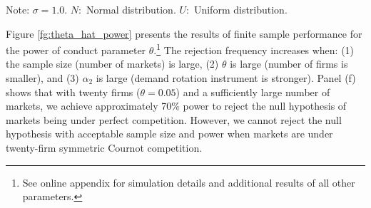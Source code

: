 \documentclass[11pt, a4paper]{article}
\begin{document}
\begin{table}[!htbp]
    \caption{True parameters and distributions}
    \label{tb:parameter_setting}
    \begin{center}
    \end{center}
    \footnotesize
    Note: $\sigma=1.0$. $N:$ Normal distribution. $U:$ Uniform distribution.
\end{table}

Figure \ref{fg:theta_hat_power} presents the results of finite sample performance for the power of conduct parameter $\theta$.\footnote{See online appendix for simulation details and additional results of all other parameters.}
The rejection frequency increases when: (1) the sample size (number of markets) is large, (2) $\theta$ is large (number of firms is smaller), and (3) $\alpha_2$ is large (demand rotation instrument is stronger).
Panel (f) shows that with twenty firms ($\theta=0.05$) and a sufficiently large number of markets, we achieve approximately 70\% power to reject the null hypothesis of markets being under perfect competition.
However, we cannot reject the null hypothesis with acceptable sample size and power when markets are under twenty-firm symmetric Cournot competition.
\end{document}
